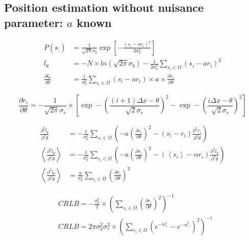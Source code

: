\documentclass[10pt,letterpaper]{article}
\begin{document}
\subsection{Position estimation without nuisance parameter: $a$ known}
\begin{align}
P\left(s_{;}\right) &=\frac{1}{\sqrt{2 \pi} \sigma_b} \exp \left[-\frac{\left(s_i-a r_i\right)^2}{2 \sigma_b^2}\right] \\ 
l_\theta &=-N \times ln\left(\sqrt{2 \pi} \sigma_b\right) - \frac{1}{2 \sigma_b^2} \sum_{s_i  \in \Omega} \left(s_i-a r_i\right)^2 \\ 
\frac{\partial l_\theta}{\partial \theta} &=\frac{1}{\sigma_b^2} \sum_{s_i \in \Omega}\left(s_i-a r_i\right) \times a \times \frac{\partial r_i}{\partial \theta} 
\end{align}


\begin{equation}
     \frac{\partial r_i}{\partial \theta}=-\frac{1}{\sqrt{2 \pi} \sigma_r} \times\left[\exp -\left(\frac{(i+1) \Delta x-\theta}{\sqrt{2} \sigma_r}\right)^2-\exp -\left(\frac{i\Delta x-\theta}{\sqrt{2} \sigma_r}\right)^2\right]
\end{equation}

\begin{align}
\frac{\partial^2 l_\theta}{\partial^2 \theta} &=-\frac{1}{\sigma_b^2} \sum_{s_i \in \Omega}\left(-a\left(\frac{\partial c_i}{\partial \theta}\right)^2-\left(s_i-r_i\right) \frac{\partial^2 r_i}{\partial^2 \theta}\right) \\
\left\langle\frac{\partial^2 l_\theta}{\partial^2 \theta}\right\rangle &=-\frac{1}{\sigma_b^2} \sum_{s_i \in \Omega}\left(-a\left(\frac{\partial r_i}{\partial \theta}\right)^2-\left(\left\langle s_i\right\rangle-\alpha r_i\right) \frac{\partial^2 l_\theta}{\partial^2 \theta}\right) \\
\left\langle\frac{\partial^2 l_\theta}{\partial^2 \theta}\right\rangle &=\frac{a}{\sigma_b^2} \sum_{s_i \in \Omega}\left(\frac{\partial r_i}{\partial \theta}\right)^2
\end{align}



\begin{align}
& C R L B=-\frac{\sigma_b^2}{1} \times\left(\sum_{s_i \in \Omega} \left(\frac{\partial r_i}{\partial \theta}\right)^2\right)^{-1} \\
& C R L B=2\pi\sigma_b^2\sigma_r^2 \times\left(\sum_{s_i \in \Omega}\left(e^{-u_+^2}-e^{-u_{-}^2}\right)^2\right)^{-1}
\end{align}
\end{document}

